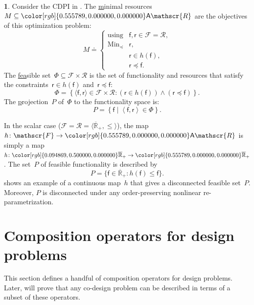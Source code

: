 \documentclass[twocolumn,english]{IEEEtran}
\theoremstyle{definition}
\theoremstyle{plain}
\theoremstyle{definition}
\newtheorem{example}{\protect\examplename}
\theoremstyle{remark}
\theoremstyle{definition}
\theoremstyle{plain}
\theoremstyle{plain}
\newcommand{\aword}[1]{\mathsf{#1}}
\newcommand{\vmath}[1]{\aword{#1}}
\newcommand{\with}{\text{using}}
\DeclareMathOperator*{\Min}{Min}
\newcommand{\posleq}{\preceq}
\newcommand{\antichains}{\vmath{A}}
\newcommand{\ftor}{{h}}
\newcommand{\funsp}{\mathscr{F}}
\newcommand{\fun}{\vmath{f}}
\newcommand{\res}{\vmath{r}}
\newcommand{\ressp}{\mathscr{R}}
\newcommand{\Aressp}{{\antichains\ressp}}
\newcommand{\colR}{\color[rgb]{0.555789,0.000000,0.000000}}
\newcommand{\colF}{\color[rgb]{0.094869,0.500000,0.000000}}
\newcommand{\R}[1]{{\colR #1}}
\newcommand{\F}[1]{{\colF #1}}
\renewcommand{\Aressp}{{\colR\antichains\ressp}}
\newcommand{\nonNegRealsComp}{\overline{\mathbb{R}}_+}
\providecommand{\examplename}{Example}
\begin{document}
\medskip{}

\begin{example}
\label{exa:one}Consider the CDPI in . The \uline{m}inimal
resources~$M\subseteq\Aressp$ are the objectives of this optimization
problem:
\[
M\doteq\begin{cases}
\with & \fun,\res\in\funsp=\ressp,\\
\Min_{\posleq} & \res,\\
 & \res\in\ftor(\fun),\\
 & \res\posleq\fun.
\end{cases}
\]
The \uline{fea}sible set~$\Phi\subseteq\funsp\times\ressp$ is
the set of functionality and resources that satisfy the constraints~$\res\in\ftor(\fun)$
and~$\res\posleq\fun$:
\begin{equation}
\Phi=\left\{ \langle\fun,\res\rangle\in\funsp\times\ressp:(\res\in\ftor(\fun))\wedge(\res\posleq\fun)\right\} .\label{eq:feasible}
\end{equation}
The \uline{p}rojection~$P$ of~$\Phi$ to the functionality space
is:
\[
P=\left\{ \fun\mid\left\langle \fun,\res\right\rangle \in\Phi\right\} .
\]

In the scalar case ($\funsp=\ressp=\langle\nonNegRealsComp,\leq\rangle$),
the map~$\ftor\colon\funsp\rightarrow\Aressp$ is simply a map~$\ftor\colon\F{\nonNegRealsComp}\rightarrow\R{\nonNegRealsComp}$.
The set~$P$ of feasible functionality is described by
\begin{equation}
P=\{\fun\in\nonNegRealsComp:\ftor(\fun)\leq\fun\}.\label{eq:Pfeasible}
\end{equation}
 shows an example of a continuous map~$\ftor$
that gives a disconnected feasible set~$P$. Moreover, $P$ is disconnected
under any order-preserving nonlinear re-parametrization.

\end{example}


\section{Composition operators for design problems}

This section defines a handful of composition operators for design
problems. Later,  will prove that any co-design
problem can be described in terms of a subset of these operators. 
\end{document}
